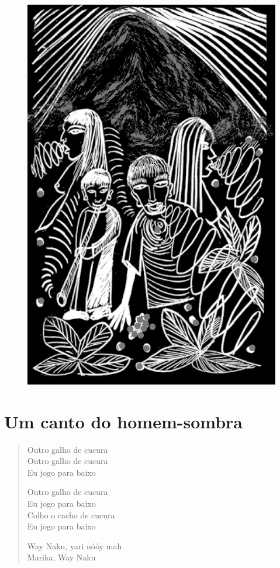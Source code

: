 \begin{figure}
\vspace*{-1.2cm}
\hspace*{-2.2cm}\includegraphics[width=138mm]{./imgs/img9.jpg}
\end{figure}

\chapter{Um canto do homem-sombra}

\begin{verse}
Outro galho de cucura\\
Outro galho de cucura\\
Eu jogo para baixo

Outro galho de cucura\\
Eu jogo para baixo\\
Colho o cacho de cucura\\
Eu jogo para baixo

Way Naku, yari nóóy mah\\
Marika, Way Naku
\end{verse}

